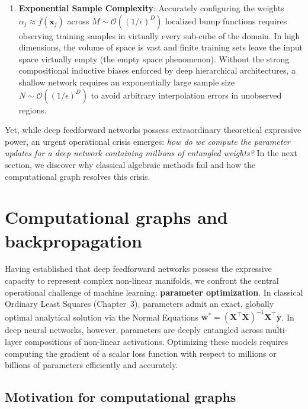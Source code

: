 \begin{enumerate}[noitemsep,topsep=2pt,parsep=0pt,partopsep=0pt]
  \item \textbf{Exponential Sample Complexity}: Accurately configuring the weights $\alpha_j \approx f(\mathbf{x}_j)$ across $M \sim \mathcal{O}((1/\epsilon)^D)$ localized bump functions requires observing training samples in virtually every sub-cube of the domain. In high dimensions, the volume of space is vast and finite training sets leave the input space virtually empty (the empty space phenomenon). Without the strong compositional inductive biases enforced by deep hierarchical architectures, a shallow network requires an exponentially large sample size $N \sim \mathcal{O}((1/\epsilon)^D)$ to avoid arbitrary interpolation errors in unobserved regions.
\end{enumerate}

Yet, while deep feedforward networks possess extraordinary theoretical expressive power, an urgent operational crisis emerges: \textit{how do we compute the parameter updates for a deep network containing millions of entangled weights?} In the next section, we discover why classical algebraic methods fail and how the computational graph resolves this crisis.

\section{Computational graphs and backpropagation}
\label{sec:computational_graphs_autodiff}
\label{sec:backpropagation_derivation}

Having established that deep feedforward networks possess the expressive capacity to represent complex non-linear manifolds, we confront the central operational challenge of machine learning: \textbf{parameter optimization}. In classical Ordinary Least Squares (Chapter~3), parameters admit an exact, globally optimal analytical solution via the Normal Equations $\mathbf{w}^* = (\mathbf{X}^\top \mathbf{X})^{-1}\mathbf{X}^\top \mathbf{y}$. In deep neural networks, however, parameters are deeply entangled across multi-layer compositions of non-linear activations. Optimizing these models requires computing the gradient of a scalar loss function with respect to millions or billions of parameters efficiently and accurately.

\subsection{Motivation for computational graphs}
\label{sec:algebraic_impasse}
\label{sec:numerical_differentiation_failure}

